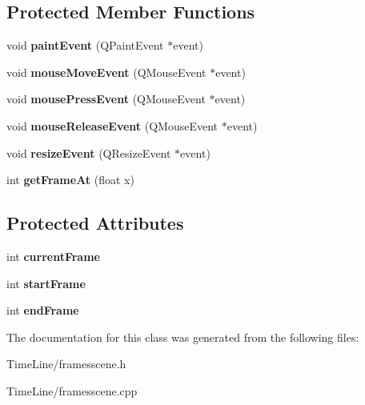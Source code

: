 \subsection*{\-Protected \-Member \-Functions}
\begin{DoxyCompactItemize}
\item 
\hypertarget{class_frames_scene_a03e64c1e369f4a9da6c852ebbf605804}{
void {\bfseries paint\-Event} (\-Q\-Paint\-Event $\ast$event)}
\label{class_frames_scene_a03e64c1e369f4a9da6c852ebbf605804}

\item 
\hypertarget{class_frames_scene_a7e70c2e402bdb12fac56702c3a42ebe8}{
void {\bfseries mouse\-Move\-Event} (\-Q\-Mouse\-Event $\ast$event)}
\label{class_frames_scene_a7e70c2e402bdb12fac56702c3a42ebe8}

\item 
\hypertarget{class_frames_scene_a05d4d0248780b70ca283d69c3eb23dbd}{
void {\bfseries mouse\-Press\-Event} (\-Q\-Mouse\-Event $\ast$event)}
\label{class_frames_scene_a05d4d0248780b70ca283d69c3eb23dbd}

\item 
\hypertarget{class_frames_scene_ae96822145f406df13d17956a4e40e5b8}{
void {\bfseries mouse\-Release\-Event} (\-Q\-Mouse\-Event $\ast$event)}
\label{class_frames_scene_ae96822145f406df13d17956a4e40e5b8}

\item 
\hypertarget{class_frames_scene_a304e4755675c7a6f36920b793b858541}{
void {\bfseries resize\-Event} (\-Q\-Resize\-Event $\ast$event)}
\label{class_frames_scene_a304e4755675c7a6f36920b793b858541}

\item 
\hypertarget{class_frames_scene_afa662fa814a3bfeff2f985cc07f6cf79}{
int {\bfseries get\-Frame\-At} (float x)}
\label{class_frames_scene_afa662fa814a3bfeff2f985cc07f6cf79}

\end{DoxyCompactItemize}
\subsection*{\-Protected \-Attributes}
\begin{DoxyCompactItemize}
\item 
\hypertarget{class_frames_scene_aa45b8e341a8bc33f9685c92beac7bc8b}{
int {\bfseries current\-Frame}}
\label{class_frames_scene_aa45b8e341a8bc33f9685c92beac7bc8b}

\item 
\hypertarget{class_frames_scene_a2900fb2b2508d184f8fc2bb4c5742856}{
int {\bfseries start\-Frame}}
\label{class_frames_scene_a2900fb2b2508d184f8fc2bb4c5742856}

\item 
\hypertarget{class_frames_scene_a54c209958d92e7ed654958356684f9a3}{
int {\bfseries end\-Frame}}
\label{class_frames_scene_a54c209958d92e7ed654958356684f9a3}

\end{DoxyCompactItemize}


\-The documentation for this class was generated from the following files\-:\begin{DoxyCompactItemize}
\item 
\-Time\-Line/framesscene.\-h\item 
\-Time\-Line/framesscene.\-cpp\end{DoxyCompactItemize}
